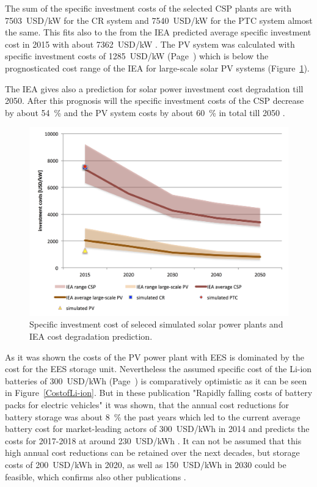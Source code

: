 The sum of the specific investment costs of the selected CSP plants are with \SI{7503}{USD/kW} for the CR system and \SI{7540}{USD/kW} for the PTC system almost the same. This fits also to the from the IEA predicted average specific investment cost in 2015 with about \SI{7362}{USD/kW} \cite{IEA2014c}. The PV system was calculated with specific investment costs of \SI{1285}{USD/kW} (Page~\pageref{SUBSUBPVFinancialparameter}) which is below the prognosticated cost range of the IEA for large-scale solar PV systems (Figure~\ref{investmentcost}). 

The IEA gives also a prediction for solar power investment cost degradation till 2050. After this prognosis will the specific investment costs of the CSP decrease by about \SI{54}{\percent} and the PV system costs by about \SI{60}{\percent} in total till 2050 \cite{IEA2014c}.

\begin{figure}[htbp]  
\centering
\includegraphics[width=1\linewidth]{FIG/investmentcost}
\caption[Specific investment cost of seleced simulated solar power plants and IEA cost degradation prediction.]{Specific investment cost of seleced simulated solar power plants and IEA cost degradation prediction.}\label{investmentcost}
\end{figure}
As it was shown the costs of the PV power plant with EES is dominated by the cost for the EES storage unit. Nevertheless the assumed specific cost of the Li-ion batteries of \SI{300}{USD/kWh}  (Page~\pageref{SUBSUBPVFinancialparameter}) is comparatively optimistic as it can be seen in Figure~\ref{CostofLi-ion}. But in these publication "Rapidly falling costs of battery packs for electric vehicles" it was shown, that the annual cost reductions for battery storage was about \SI{8}{\percent} the past years which led to the current average battery cost for market-leading actors of \SI{300}{USD/kWh} in 2014 and predicts the costs for 2017-2018 at around \SI{230}{USD/kWh} \cite{Nykvist2015}. It can not be assumed that this high annual cost reductions can be retained over the next decades, but storage costs of \SI{200}{USD/kWh} in 2020, as well as \SI{150}{USD/kWh} in 2030 could be feasible, which confirms also other publications \cite{MckinseyQuaterly2012}.

